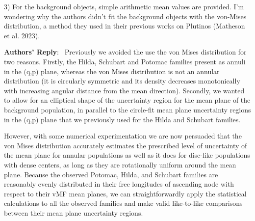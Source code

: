 \documentclass[11pt]{article}
\newenvironment{reply}
   {\medskip \noindent \begin{sf}\textbf{Authors' Reply}:\  }
   {\medskip \end{sf}\medskip}
\begin{document}
3) For the background objects, simple arithmetic mean values are provided. I'm wondering why the authors didn't fit the background objects with the von-Mises distribution, a method they used in their previous works on Plutinos (Matheson et al. 2023).

\begin{reply}
Previously we avoided the use the von Mises distribution for two reasons.
Firstly, the Hilda, Schubart and Potomac families present as annuli in the (q,p) plane, whereas the von Mises distribution is not an annular distribution (it is circularly symmetric and its density decreases monotonically with increasing angular distance from the mean direction). 
Secondly, we wanted to allow for an elliptical shape of the uncertainty region for the mean plane of the background population, in parallel to the circle-fit mean plane uncertainty regions in the (q,p) plane that we previously used for the Hilda and Schubart families.

However, with some numerical experimentation we are now persuaded that the von Mises distribution accurately estimates the prescribed level of uncertainty of the mean plane for annular populations as well as it does for disc-like populations with dense centers, as long as they are rotationally uniform around the mean plane. 
Because the observed Potomac, Hilda, and Schubart families are reasonably evenly distributed in their free longitudes of ascending node with respect to their vMF mean planes, we can straightforwardly apply the statistical calculations to all the observed families and make valid like-to-like comparisons between their mean plane uncertainty regions.
\end{reply}
\end{document}
